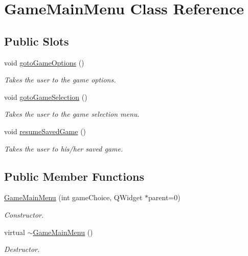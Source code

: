 \hypertarget{classGameMainMenu}{\section{\-Game\-Main\-Menu \-Class \-Reference}
\label{classGameMainMenu}
}
\subsection*{\-Public \-Slots}
\begin{DoxyCompactItemize}
\item 
void \hyperlink{classGameMainMenu_a9a8468b4b674f55fcc099a6ec6c37864}{goto\-Game\-Options} ()
\begin{DoxyCompactList}\small\item\em \-Takes the user to the game options. \end{DoxyCompactList}\item 
void \hyperlink{classGameMainMenu_aa83c655f647651d4cc51bbe7e42f85ea}{goto\-Game\-Selection} ()
\begin{DoxyCompactList}\small\item\em \-Takes the user to the game selection menu. \end{DoxyCompactList}\item 
void \hyperlink{classGameMainMenu_a007cf694f15c19787075c4b616d2ae85}{resume\-Saved\-Game} ()
\begin{DoxyCompactList}\small\item\em \-Takes the user to his/her saved game. \end{DoxyCompactList}\end{DoxyCompactItemize}
\subsection*{\-Public \-Member \-Functions}
\begin{DoxyCompactItemize}
\item 
\hyperlink{classGameMainMenu_a5d9574291780a50f447fe07af11f2dff}{\-Game\-Main\-Menu} (int game\-Choice, \-Q\-Widget $\ast$parent=0)
\begin{DoxyCompactList}\small\item\em \-Constructor. \end{DoxyCompactList}\item 
virtual \hyperlink{classGameMainMenu_a328d428d665c0fd2efcacc0a164d5042}{$\sim$\-Game\-Main\-Menu} ()
\begin{DoxyCompactList}\small\item\em \-Destructor. \end{DoxyCompactList}\end{DoxyCompactItemize}


